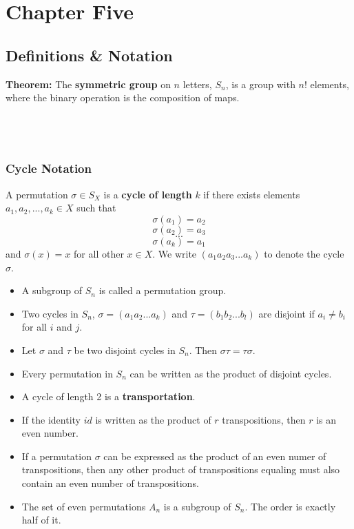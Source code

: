 \documentclass{article}
\begin{document}
\section{Chapter Five}
\subsection{Definitions \& Notation}
\textbf{Theorem:} The \textbf{symmetric group} on $n$ letters, $S_n$, is a group with $n!$ elements, where the binary operation is the composition of maps.
\\\\\\\\
\subsubsection{Cycle Notation}
A permutation $\sigma \in S_X$ is a \textbf{cycle of length} $k$ if there exists elements $a_1, a_2, ..., a_k \in X$ such that
$$\sigma(a_1)=a_2$$
$$\sigma(a_2)=a_3$$
$$...$$
$$\sigma(a_k)=a_1$$
and $\sigma(x)=x$ for all other $x\in X$. We write $(a_1 a_2 a_3 ... a_k)$ to denote the cycle $\sigma$.
\begin{itemize}
    \item A subgroup of $S_n$ is called a permutation group.
    \item Two cycles in $S_n$, $\sigma=(a_1 a_2 ... a_k)$ and $\tau=(b_1 b_2 ... b_l)$ are disjoint if $a_i \neq b_i$ for all $i$ and $j$.
    \item Let $\sigma$ and $\tau$ be two disjoint cycles in $S_n$. Then $\sigma\tau=\tau\sigma$.
    \item Every permutation in $S_n$ can be written as the product of disjoint cycles. 
    \item A cycle of length 2 is a \textbf{transportation}.
    \item If the identity $id$ is written as the product of $r$ transpositions, then $r$ is an even number.
    \item If a permutation $\sigma$ can be expressed as the product of an even numer of transpositions, then any other product of transpositions equaling must also contain an even number of transpositions.
    \item The set of even permutations $A_n$ is a subgroup of $S_n$. The order is exactly half of it.
\end{itemize}
\end{document}
